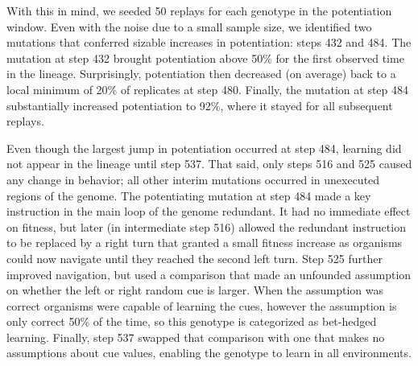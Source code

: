 With this in mind, we seeded 50 replays for each genotype in the potentiation window. 
Even with the noise due to a small sample size, %
we identified two mutations that conferred sizable increases in potentiation: steps 432 and 484.
The mutation at step 432 brought potentiation above 50\% for the first observed time in the lineage. 
Surprisingly, potentiation then decreased (on average) back to a local minimum of 20\% of replicates at step 480. 
Finally, the mutation at step 484 substantially increased potentiation to 92\%, where it stayed for all subsequent replays. 

Even though the largest jump in potentiation occurred at step 484, learning did not appear in the lineage until step 537. 
That said, only steps 516 and 525 caused any change in behavior; all other interim mutations occurred in unexecuted regions of the genome. 
The potentiating mutation at step 484 made a key instruction in the main loop of the genome redundant.
It had no immediate effect on fitness, but later (in intermediate step 516) allowed the redundant instruction to be replaced by
a right turn that granted a small fitness increase as organisms could now navigate until they reached the second left turn. 
Step 525 further improved navigation, but used a comparison that made an unfounded assumption on whether the left or right random cue is larger. 
When the assumption was correct organisms were capable of learning the cues, however the assumption is only correct 50\% of the time, so this genotype is categorized as bet-hedged learning. 
Finally, step 537 swapped that comparison with one that makes no assumptions about cue values, enabling the genotype to learn in all environments.%

